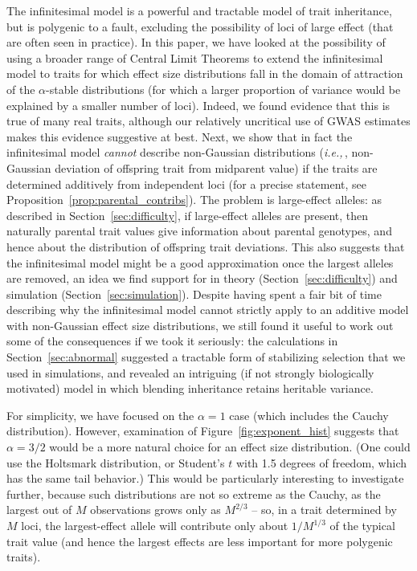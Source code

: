 \documentclass{article}
\newcommand{\ie}{\textit{i.e.,}\,}
\newcommand{\1}{\mathbbm{1}}
\theoremstyle{remark}
\theoremstyle{definition}
\begin{document}
The infinitesimal model is a powerful and tractable model of trait inheritance,
but is polygenic to a fault,
excluding the possibility of loci of large effect
(that are often seen in practice).
In this paper,
we have looked at the possibility of using a broader range of Central Limit Theorems
to extend the infinitesimal model to traits for which 
effect size distributions fall in the domain of attraction of the $\alpha$-stable distributions
(for which a larger proportion of variance
would be explained by a smaller number of loci).
Indeed, we found evidence that this is true of many real traits,
although our relatively uncritical use of GWAS estimates makes this evidence suggestive at best.
Next, we show that in fact the infinitesimal model \emph{cannot} describe non-Gaussian distributions
(\ie, non-Gaussian deviation of offspring trait from midparent value)
if the traits are determined additively from independent loci
(for a precise statement, see Proposition~\ref{prop:parental_contribs}).
The problem is large-effect alleles:
as described in Section~\ref{sec:difficulty},
if large-effect alleles are present, then naturally parental trait values give information about parental genotypes,
and hence about the distribution of offspring trait deviations.
This also suggests that the infinitesimal model might be a good approximation
once the largest alleles are removed,
an idea we find support for in theory (Section~\ref{sec:difficulty}) and simulation (Section~\ref{sec:simulation}).
Despite having spent a fair bit of time describing why
the infinitesimal model cannot strictly apply 
to an additive model with non-Gaussian effect size distributions,
we still found it useful to work out some of the consequences if we took it seriously:
the calculations in Section~\ref{sec:abnormal}
suggested a tractable form of stabilizing selection that we used in simulations,
and revealed an intriguing (if not strongly biologically motivated)
model in which blending inheritance retains heritable variance.

For simplicity, we have focused on the $\alpha=1$ case (which includes the Cauchy distribution).
However, examination of Figure~\ref{fig:exponent_hist} suggests that $\alpha=3/2$
would be a more natural choice for an effect size distribution.
(One could use the Holtsmark distribution,
or Student's $t$ with 1.5 degrees of freedom,
which has the same tail behavior.)
This would be particularly interesting to investigate further,
because such distributions are not so extreme as the Cauchy,
as the largest out of $M$ observations grows only as $M^{2/3}$ --
so, in a trait determined by $M$ loci,
the largest-effect allele will contribute only about $1/M^{1/3}$ of the typical trait value
(and hence the largest effects are less important for more polygenic traits).
\end{document}
